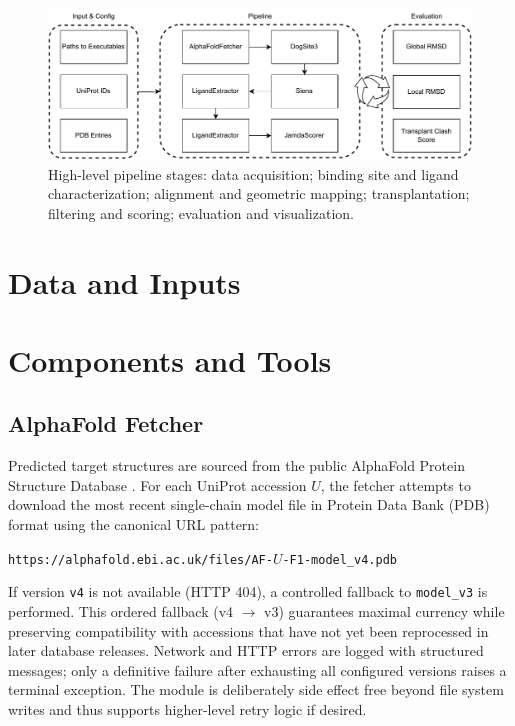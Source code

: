 \begin{figure}[H]
    \centering
    \includegraphics[width=\linewidth]{figures/pipeline_overview.drawio.pdf}
    \caption{High-level pipeline stages: data acquisition; binding site and ligand characterization; alignment and geometric mapping; transplantation; filtering and scoring; evaluation and visualization.}
    \label{fig:pipeline_overview}
\end{figure}


\section{Data and Inputs}

\section{Components and Tools}
\subsection{AlphaFold Fetcher}\label{subsec:alphafold_fetcher}

Predicted target structures are sourced from the public AlphaFold Protein Structure Database \cite{jumperHighlyAccurateProtein2021,abramsonAccurateStructurePrediction2024}. For each UniProt accession $U$, the fetcher attempts to download the most recent single-chain model file in Protein Data Bank (PDB) format using the canonical URL pattern:
\begin{center}
    \texttt{https://alphafold.ebi.ac.uk/files/AF-$U$-F1-model\_v4.pdb}
\end{center}
If version \texttt{v4} is not available (HTTP 404), a controlled fallback to \texttt{model\_v3} is performed. This ordered fallback (v4 $\rightarrow$ v3) guarantees maximal currency while preserving compatibility with accessions that have not yet been reprocessed in later database releases. Network and HTTP errors are logged with structured messages; only a definitive failure after exhausting all configured versions raises a terminal exception. The module is deliberately side effect free beyond file system writes and thus supports higher-level retry logic if desired.

